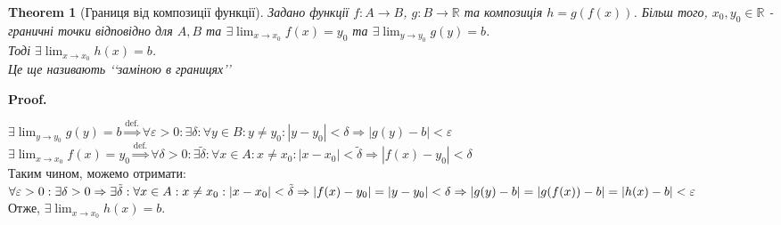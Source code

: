 \documentclass[a4paper, 14pt]{article}
\makeatletter
\def\qed{$\blacksquare$}
\theoremstyle{theoremdd}
\newtheorem{theorem}{Theorem}[subsection]
\theoremstyle{theoremdd}
\theoremstyle{theoremdd}
\theoremstyle{theoremdd}
\theoremstyle{theoremdd}
\theoremstyle{theoremdd}
\theoremstyle{theoremdd}
\theoremstyle{theoremdd}
\renewenvironment{proof}[1][Proof.\\]{\par
\pushQED{\hfill \qed}%
\normalfont \topsep6\p@\@plus6\p@\relax
\trivlist
\item\relax
{\bfseries
#1\@addpunct{.}}\hspace\labelsep\ignorespaces
}{%
\popQED\endtrivlist\@endpefalse
}
\makeatother
\begin{document}
\begin{theorem}[Границя від композиції функції]
Задано функції $f: A \to B$, $g: B \to \mathbb{R}$ та композиція $h = g(f(x))$. Більш того, $x_0, y_0 \in \mathbb{R}$ - граничні точки відповідно для $A,B$ та $\exists \displaystyle \lim_{x \to x_0} f(x) = y_0$ та $\exists \displaystyle \lim_{y \to y_0} g(y) = b$.\\
Тоді $\exists \displaystyle \lim_{x \to x_0} h(x) = b$.\\
\textit{Це ще називають \lq\lq заміною в границях\rq\rq}
\end{theorem}

\begin{proof}
$\exists \displaystyle \lim_{y \to y_0} g(y) = b \overset{\textrm{def.}}{\Rightarrow} \forall \varepsilon > 0: \exists \delta: \forall y \in B: y \neq y_0: |y-y_0|<\delta \Rightarrow |g(y)-b|<\varepsilon$\\
$\exists \displaystyle \lim_{x \to x_0} f(x) = y_0 \overset{\textrm{def.}}{\Rightarrow} \forall \delta > 0: \exists \tilde{\delta}: \forall x \in A: x \neq x_0: |x-x_0|<\tilde{\delta} \Rightarrow |f(x)-y_0|<\delta$\\
Таким чином, можемо отримати: $\forall \varepsilon > 0: \exists \delta > 0 \Rightarrow \exists \tilde{\delta}: \forall x \in A: x \neq x_0: |x-x_0| < \tilde{\delta} \Rightarrow \\ |f(x)-y_0| = |y-y_0|<\delta \Rightarrow |g(y)-b|=|g(f(x))-b| = |h(x)-b|<\varepsilon$\\
Отже, $\exists \displaystyle \lim_{x \to x_0} h(x) = b$.
\end{proof}
\end{document}
